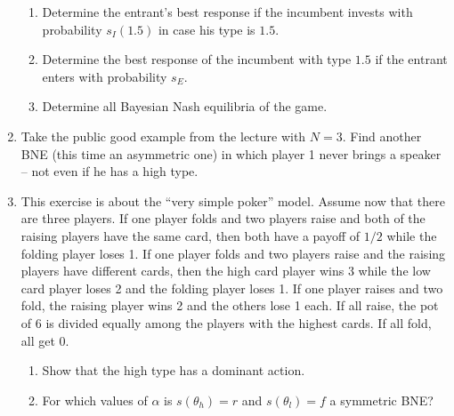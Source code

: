 \documentclass[a4paper,12pt]{article}
\begin{document}
\begin{enumerate}[resume]
\begin{enumerate}
\item Determine the entrant's best response if the incumbent invests with probability $s_I(1.5)$ in case his type is $1.5$.
\item Determine the best response of the incumbent with type $1.5$ if the entrant enters with probability $s_E$.
\item Determine all Bayesian Nash equilibria of the game.
\end{enumerate}
\item Take the public good example from the lecture with $N=3$. Find another BNE (this time an asymmetric one) in which player 1 never brings a speaker -- not even if he has a high type.
\item This exercise is about the ``very simple poker'' model. Assume now that there are three players. If one player folds and two players raise and both of the raising players have the same card, then both have a payoff of $1/2$ while the folding player loses 1. If one player folds and two players raise and the raising players have different cards, then the high card player wins 3 while the low card player loses 2 and the folding player loses 1. If one player raises and two fold, the raising player wins 2 and the others lose 1 each. If all raise, the pot of 6 is divided equally among the players with the highest cards. If all fold, all get 0.
  \begin{enumerate}
  \item Show that the high type has a dominant action.
  \item For which values of $\alpha$ is $s(\theta_h)=r$ and $s(\theta_l)=f$ a symmetric BNE?

\end{enumerate}
\end{enumerate}
\end{document}
